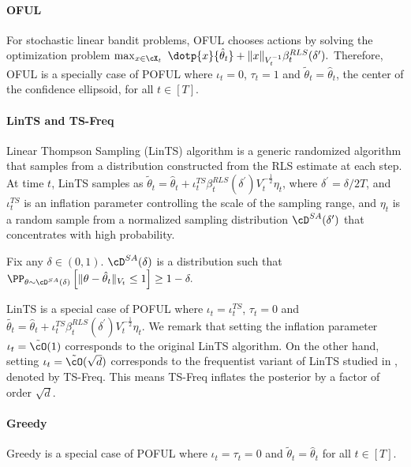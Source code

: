 \paragraph{OFUL} 
For stochastic linear bandit problems, OFUL chooses actions by solving the optimization problem 
	$
	\max_{x\in\cX_t}  \   \dotp{x}{ \hat{\theta}_t}  + \|x\|_{V_t^{-1}}   \beta^{RLS}_t(\delta^\prime).
	$
Therefore, OFUL is a specially case of POFUL where $\iota_t = 0$, $\tau_t = 1$ and $
\tilde{\theta}_t = \hat{\theta}_t$, the center of the confidence ellipsoid, for all $t\in[T]$.

\paragraph{LinTS and TS-Freq}	
Linear Thompson Sampling (LinTS) algorithm is a generic randomized algorithm that samples from a distribution constructed from the RLS estimate at each step. At time $t$, LinTS samples as $\tilde{\theta}_{t}  =\hat{\theta}_t +\iota^{TS}_t \beta_t^{RLS} (\delta^\prime) V_t^{-\frac{1}{2}} \eta_t$, where $\delta^\prime = \delta/2T$, and $\iota^{TS}_t$ is an inflation parameter controlling the scale of the sampling range, and $\eta_t$ is a random sample from a normalized sampling distribution $\cD^{SA}(\delta^\prime)$ that concentrates with high probability. 


\begin{definition}
	 Fix any $\delta \in (0,1)$. $\cD^{SA} (\delta) $  is a distribution such that $
	\PP_{\theta \sim \cD^{SA}(\delta)}\left[\|\theta - \hparam_t\|_{V_t} \leq 1\right] \geq 1 - \delta.
	$
	\end{definition}
LinTS is a special case of POFUL where  $\iota_t = \iota^{TS}_t$, $\tau_t = 0$ and $\tilde{\theta_t} = \hat{\theta}_t +\iota^{TS}_t \beta_t^{RLS} (\delta^\prime) V_t^{-\frac{1}{2}} \eta_t$. We remark that setting the inflation parameter $\iota_t = \tilde{\cO}(1)$ corresponds to the original LinTS algorithm. On the other hand,  setting $\iota_t= \tilde{\cO}(\sqrt{d})$  corresponds to the frequentist variant of LinTS studied in \cite{agrawal2013thompson,abeille2017linear}, denoted by TS-Freq. This means TS-Freq inflates the posterior by a factor of order $\sqrt{d}$.
\paragraph{Greedy} Greedy is a special case of POFUL where $\iota_t = \tau_t = 0$ and $\tilde{\theta}_t = \hat{\theta}_t$  for all $t\in[T]$.



